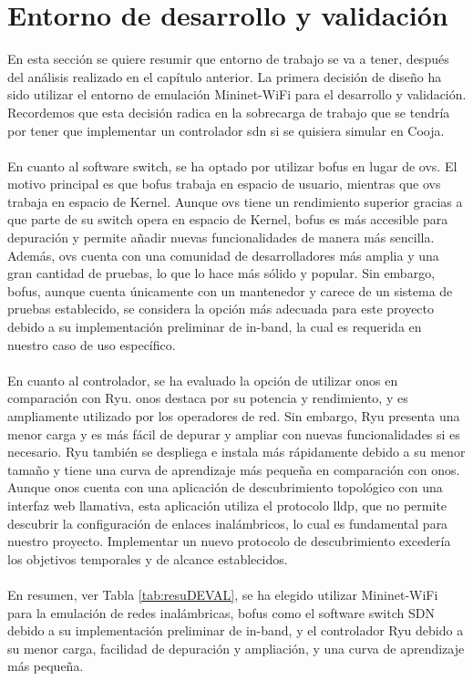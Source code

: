 \section{Entorno de desarrollo y validación}
\label{sec:scenarioDEV}

En esta sección se quiere resumir que entorno de trabajo se va a tener, después del análisis realizado en el capítulo anterior. La primera decisión de diseño ha sido utilizar el entorno de emulación Mininet-WiFi para el desarrollo y validación. Recordemos que esta decisión radica en la sobrecarga de trabajo que se tendría por tener que implementar un controlador \gls{sdn} si se quisiera simular en Cooja.\\
\\
En cuanto al software switch, se ha optado por utilizar \gls{bofus} en lugar de \gls{ovs}. El motivo principal es que \gls{bofus} trabaja en espacio de usuario, mientras que \gls{ovs} trabaja en espacio de Kernel. Aunque \gls{ovs} tiene un rendimiento superior gracias a que parte de su switch opera en espacio de Kernel, \gls{bofus} es más accesible para depuración y permite añadir nuevas funcionalidades de manera más sencilla. Además, \gls{ovs} cuenta con una comunidad de desarrolladores más amplia y una gran cantidad de pruebas, lo que lo hace más sólido y popular. Sin embargo, \gls{bofus}, aunque cuenta únicamente con un mantenedor y carece de un sistema de pruebas establecido, se considera la opción más adecuada para este proyecto debido a su implementación preliminar de in-band, la cual es requerida en nuestro caso de uso específico.\\
\\
En cuanto al controlador, se ha evaluado la opción de utilizar \gls{onos} en comparación con Ryu. \gls{onos} destaca por su potencia y rendimiento, y es ampliamente utilizado por los operadores de red. Sin embargo, Ryu presenta una menor carga y es más fácil de depurar y ampliar con nuevas funcionalidades si es necesario. Ryu también se despliega e instala más rápidamente debido a su menor tamaño y tiene una curva de aprendizaje más pequeña en comparación con \gls{onos}. Aunque \gls{onos} cuenta con una aplicación de descubrimiento topológico con una interfaz web llamativa, esta aplicación utiliza el protocolo \gls{lldp}, que no permite descubrir la configuración de enlaces inalámbricos, lo cual es fundamental para nuestro proyecto. Implementar un nuevo protocolo de descubrimiento excedería los objetivos temporales y de alcance establecidos.\\
\\
En resumen, ver Tabla \ref{tab:resuDEVAL}, se ha elegido utilizar Mininet-WiFi para la emulación de redes inalámbricas, \gls{bofus} como el software switch SDN debido a su implementación preliminar de in-band, y el controlador Ryu debido a su menor carga, facilidad de depuración y ampliación, y una curva de aprendizaje más pequeña.


